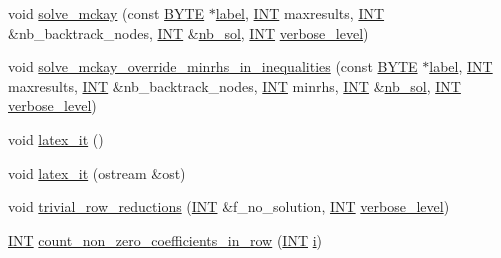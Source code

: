 \begin{DoxyCompactItemize}
\item 
void \mbox{\hyperlink{classdiophant_ac774ce59f7b84f44c6bddfe54407143b}{solve\+\_\+mckay}} (const \mbox{\hyperlink{galois_8h_ab6cc7b4aeb6ea31aba2b3fbfc83ff5e6}{B\+Y\+TE}} $\ast$\mbox{\hyperlink{classdiophant_a5f8790fdf02bf65c8c783948f46af3bb}{label}}, \mbox{\hyperlink{galois_8h_a09fddde158a3a20bd2dcadb609de11dc}{I\+NT}} maxresults, \mbox{\hyperlink{galois_8h_a09fddde158a3a20bd2dcadb609de11dc}{I\+NT}} \&nb\+\_\+backtrack\+\_\+nodes, \mbox{\hyperlink{galois_8h_a09fddde158a3a20bd2dcadb609de11dc}{I\+NT}} \&\mbox{\hyperlink{plane__search_8_c_a0029b734487624c93c3a72d74a8f2bf9}{nb\+\_\+sol}}, \mbox{\hyperlink{galois_8h_a09fddde158a3a20bd2dcadb609de11dc}{I\+NT}} \mbox{\hyperlink{simeon_8_c_a818073fbcc2f439e7c56952f67386122}{verbose\+\_\+level}})
\item 
void \mbox{\hyperlink{classdiophant_accde63853266e33e7835eee46eb00bb6}{solve\+\_\+mckay\+\_\+override\+\_\+minrhs\+\_\+in\+\_\+inequalities}} (const \mbox{\hyperlink{galois_8h_ab6cc7b4aeb6ea31aba2b3fbfc83ff5e6}{B\+Y\+TE}} $\ast$\mbox{\hyperlink{classdiophant_a5f8790fdf02bf65c8c783948f46af3bb}{label}}, \mbox{\hyperlink{galois_8h_a09fddde158a3a20bd2dcadb609de11dc}{I\+NT}} maxresults, \mbox{\hyperlink{galois_8h_a09fddde158a3a20bd2dcadb609de11dc}{I\+NT}} \&nb\+\_\+backtrack\+\_\+nodes, \mbox{\hyperlink{galois_8h_a09fddde158a3a20bd2dcadb609de11dc}{I\+NT}} minrhs, \mbox{\hyperlink{galois_8h_a09fddde158a3a20bd2dcadb609de11dc}{I\+NT}} \&\mbox{\hyperlink{plane__search_8_c_a0029b734487624c93c3a72d74a8f2bf9}{nb\+\_\+sol}}, \mbox{\hyperlink{galois_8h_a09fddde158a3a20bd2dcadb609de11dc}{I\+NT}} \mbox{\hyperlink{simeon_8_c_a818073fbcc2f439e7c56952f67386122}{verbose\+\_\+level}})
\item 
void \mbox{\hyperlink{classdiophant_a91317fb6e6784f6a28d831f9935b8a4b}{latex\+\_\+it}} ()
\item 
void \mbox{\hyperlink{classdiophant_ae65e4019fc13a94f210382142e037cc6}{latex\+\_\+it}} (ostream \&ost)
\item 
void \mbox{\hyperlink{classdiophant_a8d22fc916f3a0dc96604759f1685c1a3}{trivial\+\_\+row\+\_\+reductions}} (\mbox{\hyperlink{galois_8h_a09fddde158a3a20bd2dcadb609de11dc}{I\+NT}} \&f\+\_\+no\+\_\+solution, \mbox{\hyperlink{galois_8h_a09fddde158a3a20bd2dcadb609de11dc}{I\+NT}} \mbox{\hyperlink{simeon_8_c_a818073fbcc2f439e7c56952f67386122}{verbose\+\_\+level}})
\item 
\mbox{\hyperlink{galois_8h_a09fddde158a3a20bd2dcadb609de11dc}{I\+NT}} \mbox{\hyperlink{classdiophant_a32575931589f47546ba7b7ef9fb99e68}{count\+\_\+non\+\_\+zero\+\_\+coefficients\+\_\+in\+\_\+row}} (\mbox{\hyperlink{galois_8h_a09fddde158a3a20bd2dcadb609de11dc}{I\+NT}} \mbox{\hyperlink{alphabet2_8_c_acb559820d9ca11295b4500f179ef6392}{i}})

\end{DoxyCompactItemize}
